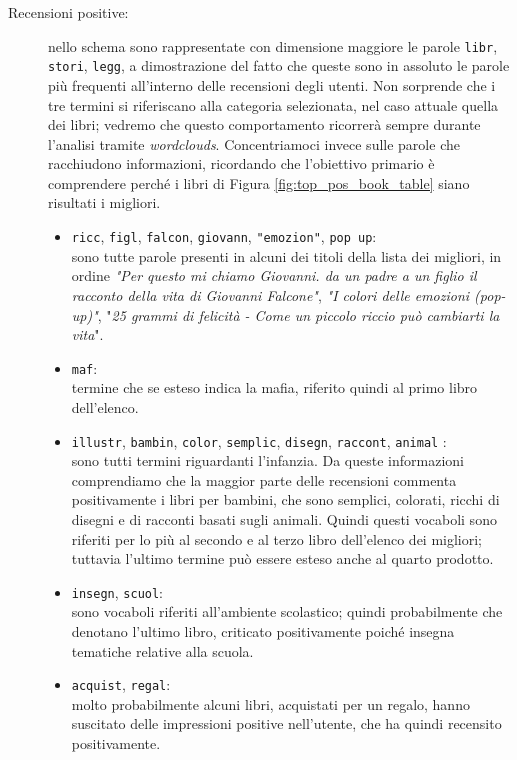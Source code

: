 				\begin{description}
					\item[Recensioni positive:]
					 nello schema sono rappresentate con dimensione maggiore le parole \verb|libr|, \verb|stori|, \verb|legg|, a dimostrazione del fatto che queste sono in assoluto le parole più frequenti all'interno delle recensioni degli utenti. Non sorprende che i tre termini si riferiscano alla categoria selezionata, nel caso attuale quella dei libri; vedremo che questo comportamento ricorrerà sempre durante l'analisi tramite \textit{wordclouds}. Concentriamoci invece sulle parole che racchiudono informazioni, ricordando che l'obiettivo primario è comprendere perché i libri di Figura \ref{fig:top_pos_book_table} siano risultati i migliori.
					\begin{itemize}
						\item \texttt{ricc}, \texttt{figl}, \texttt{falcon},  \texttt{giovann}, \texttt{"emozion"}, \texttt{pop up}: \\
						sono tutte parole presenti in alcuni dei titoli della lista dei migliori, in ordine \textit{"Per questo mi chiamo Giovanni. da un padre a un figlio il racconto della vita di Giovanni Falcone"}, \textit{"I colori delle emozioni (pop-up)"}, "\textit{25 grammi di felicità - Come un piccolo riccio può cambiarti la vita}". 
						\item \texttt{maf}: \\
						termine che se esteso indica la mafia, riferito quindi al primo libro dell'elenco.
						\item \texttt{illustr}, \texttt{bambin}, \texttt{color}, \texttt{semplic},  \texttt{disegn}, \texttt{raccont}, \texttt{animal} : \\
						sono tutti termini riguardanti l'infanzia. Da queste informazioni comprendiamo che la maggior parte delle recensioni commenta positivamente i libri per bambini, che sono semplici, colorati, ricchi di disegni e di racconti basati sugli animali. Quindi questi vocaboli sono riferiti per lo più al secondo e al terzo libro dell'elenco dei migliori; tuttavia l'ultimo termine può essere esteso anche al quarto prodotto. 
						\item \texttt{insegn}, \texttt{scuol}: \\
						sono vocaboli riferiti all'ambiente scolastico; quindi probabilmente che denotano l'ultimo libro, criticato positivamente poiché insegna tematiche relative alla scuola.
						\item \texttt{acquist}, \texttt{regal}: \\
						molto probabilmente alcuni libri, acquistati per un regalo, hanno suscitato delle impressioni positive nell'utente, che ha quindi recensito positivamente.
					\end{itemize}	
				

\end{description}
